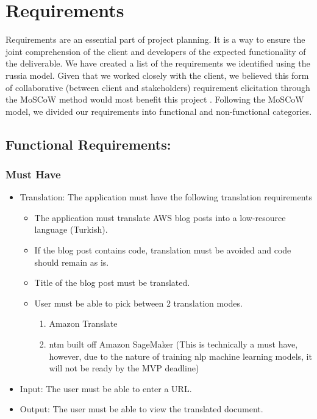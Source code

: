 \section{Requirements}
\label{sec:Requirements}

\indent \indent Requirements are an essential part of project planning. It is a way to ensure the joint comprehension of the client and developers of the expected functionality of the deliverable. We have created a list of the requirements we identified using the \gls{russia} model. Given that we worked closely with the client, we believed this form of collaborative (between client and stakeholders) requirement elicitation through the MoSCoW method would most benefit this project \cite{moscow}. Following the MoSCoW model, we divided our requirements into functional and non-functional categories.

\subsection{Functional Requirements:}

\subsubsection*{Must Have}

\begin{itemize}
\item Translation: The application must have the following translation requirements
\begin{itemize}
\item The application must translate AWS blog posts into a low-resource language (Turkish).
 \item If the blog post contains code, translation must be avoided and code should remain as is.
\item Title of the blog post must be translated.
\item User must be able to pick between 2 translation modes.
\begin{enumerate}
\item Amazon Translate
\item \gls{ntm} built off Amazon SageMaker (This is technically a must have, however, due to the nature of training \gls{nlp} machine learning models, it will not be ready by the MVP deadline)
\end{enumerate}
\end{itemize}
\item Input: The user must be able to enter a URL.
\item Output: The user must be able to view the translated document.
\end{itemize}

